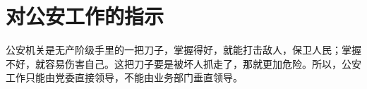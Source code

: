 \section[对公安工作的指示（一九六七年八月）]{对公安工作的指示}


公安机关是无产阶级手里的一把刀子，掌握得好，就能打击敌人，保卫人民；掌握不好，就容易伤害自己。这把刀子要是被坏人抓走了，那就更加危险。所以，公安工作只能由党委直接领导，不能由业务部门垂直领导。


